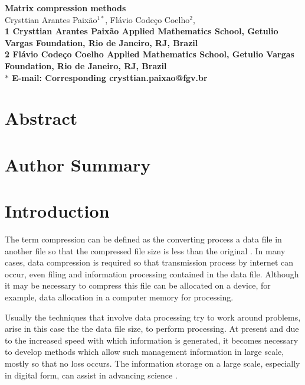 \documentclass[10pt]{article}
\date{}
\begin{document}
\begin{flushleft}
{\Large
\textbf{Matrix compression methods}
}
\\
Crysttian Arantes Paix\~{a}o$^{1\ast}$, 
Fl\'{a}vio Code\c{c}o Coelho$^{2}$, 
\\
\bf{1} Crysttian Arantes Paix\~{a}o Applied Mathematics School, Getulio Vargas Foundation, Rio de Janeiro, RJ, Brazil
\\
\bf{2} Fl\'{a}vio Code\c{c}o Coelho Applied Mathematics School, Getulio Vargas Foundation, Rio de Janeiro, RJ, Brazil
\\
$\ast$ E-mail: Corresponding crysttian.paixao@fgv.br
\end{flushleft}

\section*{Abstract}

\section*{Author Summary}

\section*{Introduction}

The term compression can be defined as the converting process a data file in another file so that the compressed file size is less than the original \cite{salomon}. In many cases, data compression is required so that transmission process by internet can occur, even filing and information processing contained in the data file. Although it may be necessary to compress this file can be allocated on a device, for example, data allocation in a computer memory for processing.

Usually the techniques that involve data processing try to work around problems, arise in this case the the data file size, to perform processing. At present and due to the increased speed with which information is generated, it becomes necessary to develop methods which allow such management information in large scale, mostly so that no loss occurs. The information storage on a large scale, especially in digital form, can assist in advancing science \cite{lynch}.
\end{document}
